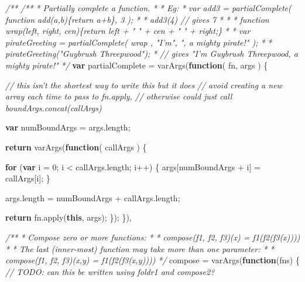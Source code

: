 \documentclass[12pt, ]{article}
\newenvironment{Shaded}{}{}
\newcommand{\KeywordTok}[1]{\textcolor[rgb]{0.00,0.44,0.13}{\textbf{{#1}}}}
\newcommand{\DecValTok}[1]{\textcolor[rgb]{0.25,0.63,0.44}{{#1}}}
\newcommand{\CommentTok}[1]{\textcolor[rgb]{0.38,0.63,0.69}{\textit{{#1}}}}
\newcommand{\OtherTok}[1]{\textcolor[rgb]{0.00,0.44,0.13}{{#1}}}
\newcommand{\FunctionTok}[1]{\textcolor[rgb]{0.02,0.16,0.49}{{#1}}}
\newcommand{\NormalTok}[1]{{#1}}
\begin{document}
\begin{Shaded}
\begin{Highlighting}[]
\CommentTok{/** }
\CommentTok{/** }
\CommentTok{ * Partially complete a function.}
\CommentTok{ * }
\CommentTok{ * Eg: }
\CommentTok{ *    var add3 = partialComplete( function add(a,b)\{return a+b\}, 3 );}
\CommentTok{ *    }
\CommentTok{ *    add3(4) // gives 7}
\CommentTok{ *    }
\CommentTok{ *    }
\CommentTok{ *    function wrap(left, right, cen)\{return left + " " + cen + " " + right;\}}
\CommentTok{ *    }
\CommentTok{ *    var pirateGreeting = partialComplete( wrap , "I'm", ", a mighty pirate!" );}
\CommentTok{ *    }
\CommentTok{ *    pirateGreeting("Guybrush Threepwood"); }
\CommentTok{ *                         // gives "I'm Guybrush Threepwood, a mighty pirate!"}
\CommentTok{ */}
\KeywordTok{var} \NormalTok{partialComplete = }\FunctionTok{varArgs}\NormalTok{(}\KeywordTok{function}\NormalTok{( fn, args ) \{}

      \CommentTok{// this isn't the shortest way to write this but it does}
      \CommentTok{// avoid creating a new array each time to pass to fn.apply,}
      \CommentTok{// otherwise could just call boundArgs.concat(callArgs)       }

      \KeywordTok{var} \NormalTok{numBoundArgs = }\OtherTok{args}\NormalTok{.}\FunctionTok{length}\NormalTok{;}

      \KeywordTok{return} \FunctionTok{varArgs}\NormalTok{(}\KeywordTok{function}\NormalTok{( callArgs ) \{}
         
         \KeywordTok{for} \NormalTok{(}\KeywordTok{var} \NormalTok{i = }\DecValTok{0}\NormalTok{; i < }\OtherTok{callArgs}\NormalTok{.}\FunctionTok{length}\NormalTok{; i++) \{}
            \NormalTok{args[numBoundArgs + i] = callArgs[i];}
         \NormalTok{\}}
         
         \OtherTok{args}\NormalTok{.}\FunctionTok{length} \NormalTok{= numBoundArgs + }\OtherTok{callArgs}\NormalTok{.}\FunctionTok{length}\NormalTok{;         }
                     
         \KeywordTok{return} \OtherTok{fn}\NormalTok{.}\FunctionTok{apply}\NormalTok{(}\KeywordTok{this}\NormalTok{, args);}
      \NormalTok{\}); }
   \NormalTok{\}),}

\CommentTok{/**}
\CommentTok{ * Compose zero or more functions:}
\CommentTok{ * }
\CommentTok{ *    compose(f1, f2, f3)(x) = f1(f2(f3(x))))}
\CommentTok{ * }
\CommentTok{ * The last (inner-most) function may take more than one parameter:}
\CommentTok{ * }
\CommentTok{ *    compose(f1, f2, f3)(x,y) = f1(f2(f3(x,y))))}
\CommentTok{ */}
   \NormalTok{compose = }\FunctionTok{varArgs}\NormalTok{(}\KeywordTok{function}\NormalTok{(fns) \{}
      \CommentTok{// TODO: can this be written using foldr1 and compose2?}


\end{Highlighting}
\end{Shaded}
\end{document}
